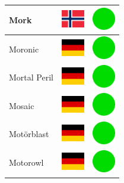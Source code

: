 \documentclass[12pt, a4paper, twoside]{report}
\begin{document}
\begin{center}
\begin{longtable}{|p{5cm}|p{2cm}|p{2cm}|}
Mork & \includegraphics[width=1cm]{4x3/no} & \includegraphics[width=1cm]{likes/y} \\ \hline
Moronic & \includegraphics[width=1cm]{4x3/de} & \includegraphics[width=1cm]{likes/y} \\ \hline
Mortal Peril & \includegraphics[width=1cm]{4x3/de} & \includegraphics[width=1cm]{likes/y} \\ \hline
Mosaic & \includegraphics[width=1cm]{4x3/de} & \includegraphics[width=1cm]{likes/y} \\ \hline
Motörblast & \includegraphics[width=1cm]{4x3/de} & \includegraphics[width=1cm]{likes/y} \\ \hline
Motorowl & \includegraphics[width=1cm]{4x3/de} & \includegraphics[width=1cm]{likes/y} \\ \hline

\end{longtable}
\end{center}
\end{document}
